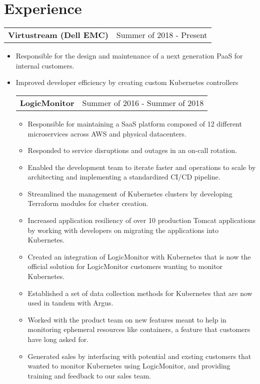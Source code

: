 \section*{Experience}
\begin{tabular}{l r}
	\textbf{Virtustream (Dell EMC)} & Summer of 2018 - Present \\
\end{tabular}
\begin{itemize}
	\item Responsible for the design and maintenance of a next generation PaaS for internal customers.
	\item Improved developer efficiency by creating custom Kubernetes controllers
\begin{tabular}{l r}
	\textbf{LogicMonitor} & Summer of 2016 - Summer of 2018 \\
\end{tabular}
\begin{itemize}
	\item Responsible for maintaining a SaaS platform composed of 12 different microservices across AWS and physical datacenters.
	\item Responded to service disruptions and outages in an on-call rotation.
	\item Enabled the development team to iterate faster and operations to scale by architecting and implementing a standardized CI/CD pipeline.
	\item Streamlined the management of Kubernetes clusters by developing Terraform modules for cluster creation.
	\item Increased application resiliency of over 10 production Tomcat applications by working with developers on migrating the applications into Kubernetes.
	\item Created an integration of LogicMonitor with Kubernetes that is now the official solution for LogicMonitor customers wanting to monitor Kubernetes. 
	\item Established a set of data collection methods for Kubernetes that are now used in tandem with Argus.
	\item Worked with the product team on new features meant to help in monitoring ephemeral resources like containers, a feature that customers have long asked for.
	\item Generated sales by interfacing with potential and exsting customers that wanted to monitor Kubernetes using LogicMonitor, and providing training and feedback to our sales team.

\end{itemize}
\end{itemize}
